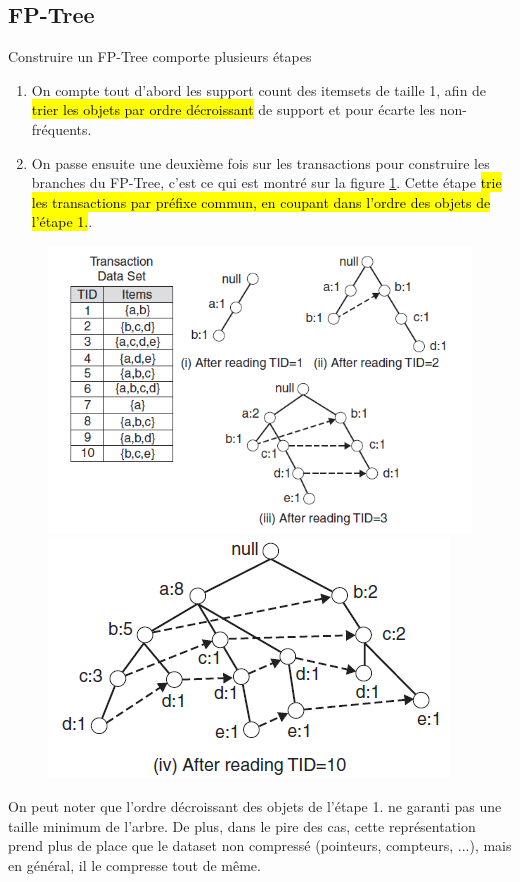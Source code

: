 \documentclass[letterpaper, 12pt]{article}
\newcommand{\alinea}{
\hspace*{0.5cm}}
\begin{document}
		\subsection{FP-Tree}
			\alinea Construire un FP-Tree comporte plusieurs étapes
			\begin{enumerate}
				\setlength{\itemsep}{0pt}
				\setlength{\parskip}{0pt}
				\setlength{\parsep}{0pt}
				\item On compte tout d'abord les support count des itemsets
					de taille 1, afin de \hl{trier les objets par ordre 
					décroissant} de support et pour écarte les non-fréquents.
				\item On passe ensuite une deuxième fois sur les transactions
					pour construire les branches du FP-Tree, c'est ce qui est
					montré sur la figure \ref{fig:fptree:1}. Cette étape
					\hl{trie les transactions par préfixe commun, en
					coupant dans l'ordre des objets de l'étape 1.}.
			\end{enumerate}
			\begin{figure}[H]
				\centering
				\includegraphics[scale=0.625]{Images/fptree_1a.png}
				\includegraphics[scale=0.625]{Images/fptree_1b.png}
				\caption{}
				\label{fig:fptree:1}
			\end{figure}\noindent
			On peut noter que l'ordre décroissant des objets de l'étape 1.
			ne garanti pas une taille minimum de l'arbre. De plus,
			dans le pire des cas, cette représentation prend plus de place
			que le dataset non compressé (pointeurs, compteurs, ...), mais
			en général, il le compresse tout de même.
\end{document}
